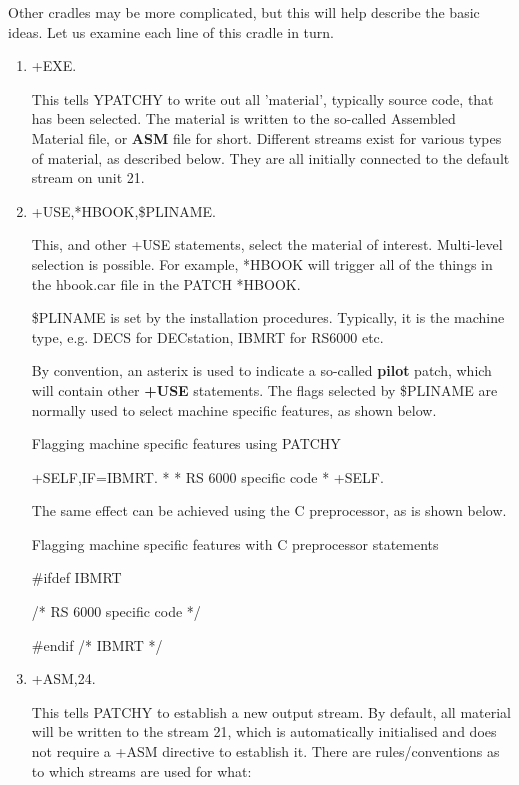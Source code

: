 Other cradles may be more complicated, but this will help describe
the basic ideas. Let us examine each line of this cradle in turn.

\begin{enumerate}
\item
+EXE.

This tells YPATCHY to write out all 'material', typically source code,
that has been selected. The material is written to 
the so-called Assembled Material file, or {\bf ASM} file for short.
Different streams exist for various types of material, as described
below. They are all initially connected to the default stream 
on unit 21.

\item
+USE,*HBOOK,\$PLINAME.

This, and other +USE statements, select the material of interest.
Multi-level selection is possible. For example, *HBOOK will trigger
all of the things in the hbook.car file in the PATCH *HBOOK.

\$PLINAME is set by the installation procedures. Typically, it is
the machine type, e.g. DECS for DECstation, IBMRT for RS6000 etc.

By convention, an asterix is used to indicate a so-called {\bf pilot}
patch, which will contain other {\bf +USE} statements. The flags 
selected by \$PLINAME are normally used to select machine specific
features, as shown below.

\begin{XMPt}{Flagging machine specific features using PATCHY}

+SELF,IF=IBMRT.
*
*     RS 6000 specific code
*
+SELF.

\end{XMPt}

The same effect can be achieved using the C preprocessor,
as is shown below.

\begin{XMPt}{Flagging machine specific features with C preprocessor statements}

#ifdef IBMRT

/* RS 6000 specific code
 */

#endif /* IBMRT */

\end{XMPt}

\item
+ASM,24.

This tells PATCHY to establish a new output stream. By default,
all material will be written to the stream 21, which is automatically
initialised and does not require a +ASM directive to establish it.
There are rules/conventions as to which streams are used for what:


\end{enumerate}
